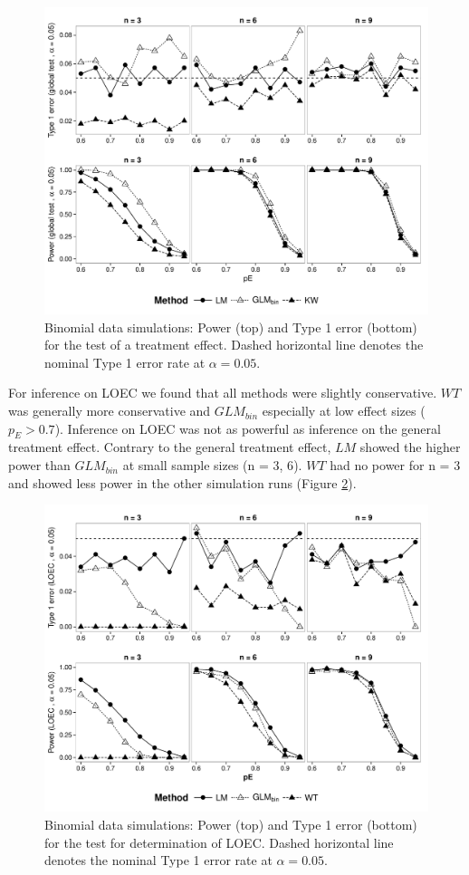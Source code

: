 \documentclass[twocolumn, natbib]{svjour3}
\begin{document}
\begin{figure}
  \centering
  \includegraphics[width = 129mm]{p_glob_p.pdf}
  \caption{
  Binomial data simulations: 
  Power (top) and Type 1 error (bottom) for the test of a treatment effect. 
  Dashed horizontal line denotes the nominal Type 1 error rate at $\alpha = 0.05$.
  }
  \label{fig:p_glob_p}
\end{figure}

For inference on LOEC we found that all methods were slightly conservative.
$WT$ was generally more conservative and $GLM_{bin}$ especially at low effect sizes ($p_E > 0.7$).
Inference on LOEC was not as powerful as inference on the general treatment effect.
Contrary to the general treatment effect, $LM$ showed the higher power than $GLM_{bin}$ at small sample sizes (n = {3, 6}).
$WT$ had no power for n = 3 and showed less power in the other simulation runs (Figure \ref{fig:p_loec_p}).

\begin{figure}
  \centering
  \includegraphics[width = 129mm]{p_loec_p.pdf}
  \caption{
  Binomial data simulations: 
  Power (top) and Type 1 error (bottom) for the test for determination of LOEC. 
  Dashed horizontal line denotes the nominal Type 1 error rate at $\alpha = 0.05$.
  }
  \label{fig:p_loec_p}
\end{figure}
\end{document}
